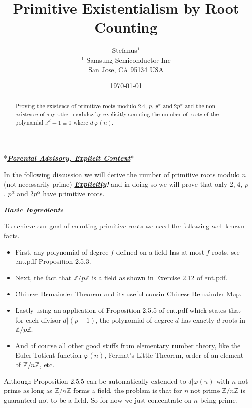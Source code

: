 \documentclass[aps,preprint,preprintnumbers,nofootinbib,showpacs,prd]{revtex4-1}
\newcommand{\bit}{\begin{itemize}}
\newcommand{\eit}{\end{itemize}}
\begin{document}
\title{Primitive Existentialism by Root Counting}
\bigskip
\author{Stefanus$^1$\\
$^1$ Samsung Semiconductor Inc\\ San Jose, CA 95134 USA\\
}
%
\date{\today}
%
\begin{abstract}
Proving the existence of primitive roots modulo 2,4, $p$, $p^\alpha$ and $2p^\alpha$ and the non existence of any other modulos by explicitly counting the number of roots of the polynomial $x^d - 1\equiv 0$ where $d|\varphi(n)$.

\end{abstract}
%
\maketitle

\renewcommand{\theequation}{A.\arabic{equation}}  %
\setcounter{equation}{0}  %

*\hspace{0.5mm}\underline{\textit{\textbf {Parental Advisory, Explicit Content}}}\hspace{0.7mm}*

In the following discussion we will derive the number of primitive roots modulo $n$ (not necessarily prime) \underline{\textbf{\textit{Explicitly}}}\textbf{\textit{!}} and in doing so we will prove that only 2, 4, $p$, $p^\alpha$ and $2p^\alpha$ have primitive roots.

\bigskip
\underline{\textit{\textbf{Basic Ingredients}}}
\bigskip

To achieve our goal of counting primitive roots we need the following well known facts.
\bit
%
\item First, any polynomial of degree $f$ defined on a field has at most $f$ roots, see ent.pdf Proposition 2.5.3.
%
\item Next, the fact that $\mathbb{Z}/p\mathbb{Z}$ is a field as shown in Exercise 2.12 of ent.pdf.
%
\item Chinese Remainder Theorem and its useful cousin Chinese Remainder Map.
%
\item Lastly using an application of Proposition 2.5.5 of ent.pdf which states that for each divisor $d|(p-1)$, the polynomial of degree $d$ has exactly $d$ roots in $\mathbb{Z}/p\mathbb{Z}$.
%
\item And of course all other good stuffs from elementary number theory, like the Euler Totient function $\varphi(n)$, Fermat's Little Theorem, order of an element of $\mathbb{Z}/n\mathbb{Z}$, etc.
%
\eit
%
Although Proposition 2.5.5 can be automatically extended to $d|\varphi(n)$ with $n$ not prime as long as $\mathbb{Z}/n\mathbb{Z}$ forms a field, the problem is that for $n$ not prime $\mathbb{Z}/n\mathbb{Z}$ is guaranteed not to be a field. So for now we just concentrate on $n$ being prime.
\end{document}
